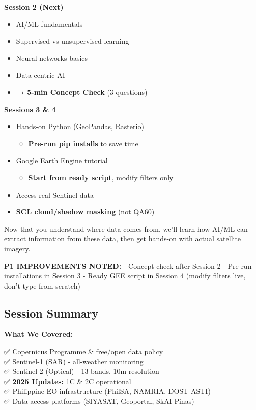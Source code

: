 \documentclass[
  letterpaper,
  DIV=11,
  numbers=noendperiod]{scrartcl}
\providecommand{\tightlist}{%
  \setlength{\itemsep}{0pt}\setlength{\parskip}{0pt}}
\begin{document}
\textbf{Session 2 (Next)}

\begin{itemize}
\tightlist
\item
  AI/ML fundamentals
\item
  Supervised vs unsupervised learning
\item
  Neural networks basics
\item
  Data-centric AI
\item
  \textbf{→ 5-min Concept Check} (3 questions)
\end{itemize}

\textbf{Sessions 3 \& 4}

\begin{itemize}
\tightlist
\item
  Hands-on Python (GeoPandas, Rasterio)

  \begin{itemize}
  \tightlist
  \item
    \textbf{Pre-run pip installs} to save time
  \end{itemize}
\item
  Google Earth Engine tutorial

  \begin{itemize}
  \tightlist
  \item
    \textbf{Start from ready script}, modify filters only
  \end{itemize}
\item
  Access real Sentinel data
\item
  \textbf{SCL cloud/shadow masking} (not QA60)
\end{itemize}

Now that you understand where data comes from, we'll learn how AI/ML can
extract information from these data, then get hands-on with actual
satellite imagery.

\textbf{P1 IMPROVEMENTS NOTED:} - Concept check after Session 2 -
Pre-run installations in Session 3 - Ready GEE script in Session 4
(modify filters live, don't type from scratch)

\subsection{Session Summary}\label{session-summary}

\textbf{What We Covered:}

✅ Copernicus Programme \& free/open data policy\\
✅ Sentinel-1 (SAR) - all-weather monitoring\\
✅ Sentinel-2 (Optical) - 13 bands, 10m resolution\\
✅ \textbf{2025 Updates:} 1C \& 2C operational\\
✅ Philippine EO infrastructure (PhilSA, NAMRIA, DOST-ASTI)\\
✅ Data access platforms (SIYASAT, Geoportal, SkAI-Pinas)
\end{document}
